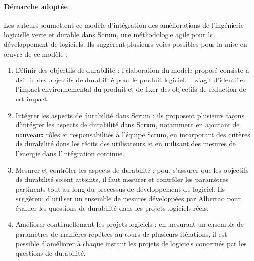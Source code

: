 \paragraph{Démarche adoptée}
Les auteurs soumettent ce modèle d'intégration des améliorations de l'ingénierie logicielle verte et durable dans Scrum, une méthodologie agile pour le développement de logiciels. Ils suggèrent plusieurs voies possibles pour la mise en œuvre de ce modèle :
\begin{enumerate}
    \item Définir des objectifs de durabilité : l'élaboration du modèle proposé consiste à définir des objectifs de durabilité pour le produit logiciel. Il s'agit d'identifier l'impact environnemental du produit et de fixer des objectifs de réduction de cet impact.
    \item Intégrer les aspects de durabilité dans Scrum : ils proposent plusieurs façons d'intégrer les aspects de durabilité dans Scrum, notamment en ajoutant de nouveaux rôles et responsabilités à l'équipe Scrum, en incorporant des critères de durabilité dans les récits des utilisateurs et en utilisant des mesures de l'énergie dans l'intégration continue.
    \item Mesurer et contrôler les aspects de durabilité : pour s'assurer que les objectifs de durabilité soient atteints, il faut mesurer et contrôler les paramètres pertinents tout au long du processus de développement du logiciel. Ils suggèrent d'utiliser un ensemble de mesures développées par Albertao \cite{Albertao} pour évaluer les questions de durabilité dans les projets logiciels réels.
    \item Améliorer continuellement les projets logiciels : en mesurant un ensemble de paramètres de manières répétées au cours de plusieurs itérations, il est possible d'améliorer à chaque instant les projets de logiciels concernés par les questions de durabilité.
\end{enumerate}

